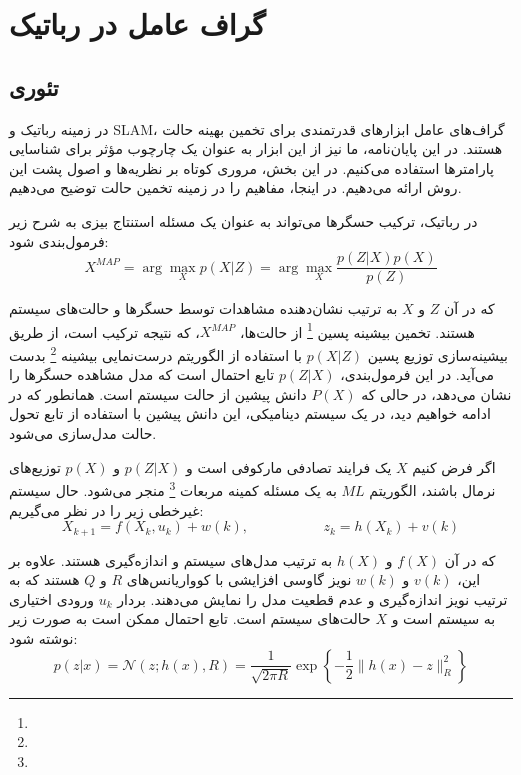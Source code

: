 \chapter{گراف عامل در رباتیک} \label{sec:appendix1}

\section{تئوری}

در زمینه رباتیک و SLAM، گراف‌های عامل ابزارهای قدرتمندی برای تخمین بهینه حالت هستند. در این پایان‌نامه، ما نیز از این ابزار به عنوان یک چارچوب مؤثر برای شناسایی پارامترها استفاده می‌کنیم. در این بخش، مروری کوتاه بر نظریه‌ها و اصول پشت این روش ارائه می‌دهیم. در اینجا، مفاهیم را در زمینه تخمین حالت توضیح می‌دهیم.

در رباتیک، ترکیب حسگرها می‌تواند به عنوان یک مسئله استنتاج بیزی به شرح زیر فرمول‌بندی شود:
\begin{equation} \label{eq:MAP}
	X^{MAP} = \arg\max_X p(X|Z) = \arg\max_X \frac{p(Z|X)p(X)}{p(Z)}
\end{equation}

که در آن \(Z\) و \(X\) به ترتیب نشان‌دهنده مشاهدات توسط حسگرها و حالت‌های سیستم هستند. تخمین بیشینه پسین
\footnote{}
 از حالت‌ها، \(X^{MAP}\)، که نتیجه ترکیب است، از طریق بیشینه‌سازی توزیع پسین \(p(X|Z)\) با استفاده از الگوریتم درست‌نمایی بیشینه
\footnote{}
بدست می‌آید. در این فرمول‌بندی، \(p(Z|X)\) تابع احتمال است که مدل مشاهده حسگرها را نشان می‌دهد، در حالی که \(P(X)\) دانش پیشین از حالت سیستم است. همانطور که در ادامه خواهیم دید، در یک سیستم دینامیکی، این دانش پیشین با استفاده از تابع تحول حالت مدل‌سازی می‌شود.

اگر فرض کنیم \(X\) یک فرایند تصادفی مارکوفی است و \(p(Z|X)\) و \(p(X)\) توزیع‌های نرمال باشند، الگوریتم $ML$ به یک مسئله کمینه مربعات
\footnote{}
 منجر می‌شود.  حال سیستم غیرخطی زیر را در نظر می‌گیریم:
\begin{equation}
	X_{k+1} = f(X_k, u_k) + w(k), \text{~~~~~~~~~~~~~~~~} z_k = h(X_k) + v(k)
\end{equation}


که در آن \(f(X)\) و \(h(X)\) به ترتیب مدل‌های سیستم و اندازه‌گیری هستند. علاوه بر این، \(v(k)\) و \(w(k)\) نویز گاوسی افزایشی با کوواریانس‌های \(R\) و \(Q\) هستند که به ترتیب نویز اندازه‌گیری و عدم قطعیت مدل را نمایش می‌دهند. بردار \(u_k\) ورودی اختیاری به سیستم است و \(X\) حالت‌های سیستم است. تابع احتمال ممکن است به صورت زیر نوشته شود:
\begin{equation} \label{eq:Gauess_Dis_h}
	p(z|x) = \mathcal{N}(z; h(x), R) = \frac{1}{\sqrt{2\pi R}} \exp \left\{ -\frac{1}{2} \| h(x) - z \|_R^2 \right\}
\end{equation}

